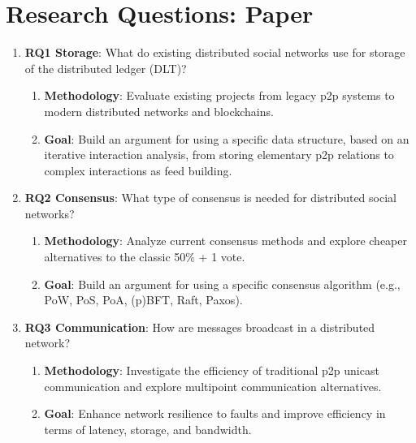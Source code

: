 \section{Research Questions: Paper}
\begin{frame}
    \begin{enumerate}
        \item \textbf{RQ1 Storage}: What do existing distributed social networks use for storage of the distributed ledger (DLT)?
        \begin{enumerate}
            \item \textbf{Methodology}: Evaluate existing projects from legacy p2p systems to modern distributed networks and blockchains.
            \item \textbf{Goal}: Build an argument for using a specific data structure, based on an iterative interaction analysis, from storing elementary p2p relations to complex interactions as feed building.
        \end{enumerate}
        \item \textbf{RQ2 Consensus}: What type of consensus is needed for distributed social networks?
        \begin{enumerate}
            \item \textbf{Methodology}: Analyze current consensus methods and explore cheaper alternatives to the classic 50\% + 1 vote.
            \item \textbf{Goal}: Build an argument for using a specific consensus algorithm (e.g., PoW, PoS, PoA, (p)BFT, Raft, Paxos).
        \end{enumerate}
        \item \textbf{RQ3 Communication}: How are messages broadcast in a distributed network?
        \begin{enumerate}
            \item \textbf{Methodology}: Investigate the efficiency of traditional p2p unicast communication and explore multipoint communication alternatives.
            \item \textbf{Goal}: Enhance network resilience to faults and improve efficiency in terms of latency, storage, and bandwidth.
        \end{enumerate}
    \end{enumerate}
\end{frame}